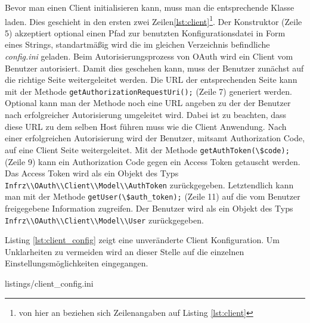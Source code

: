 \documentclass[12pt,a4paper,pointednumbers,abstracton]{scrartcl}
\newcommand{\code}[1]{\small\lstinline[style=InlinePHP]!#1!\normalsize}
\begin{document}
Bevor man einen Client initialisieren kann, muss man die entsprechende Klasse laden.
Dies geschieht in den ersten zwei Zeilen\ref{lst:client}\footnote{von hier an beziehen sich Zeilenangaben auf Listing \ref{lst:client}}.
Der Konstruktor (Zeile 5) akzeptiert optional einen Pfad zur benutzten Konfigurationsdatei in Form eines Strings, standartmäßig wird die im gleichen Verzeichnis befindliche \emph{config.ini} geladen.
Beim Autorisierungsprozess von OAuth wird ein Client vom Benutzer autorisiert.
Damit dies geschehen kann, muss der Benutzer zunächst auf die richtige Seite weitergeleitet werden.
Die URL der entsprechenden Seite kann mit der Methode \code{getAuthorizationRequestUri();} (Zeile 7) generiert werden.
Optional kann man der Methode noch eine URL angeben zu der der Benutzer nach erfolgreicher Autorisierung umgeleitet wird.
Dabei ist zu beachten, dass diese URL zu dem selben Host führen muss wie die Client Anwendung.
Nach einer erfolgreichen Autorisierung wird der Benutzer, mitsamt Authorization Code, auf eine Client Seite weitergeleitet.
Mit der Methode \code{getAuthToken(\$code);} (Zeile 9) kann ein Authorization Code gegen ein Access Token getauscht werden.
Das Access Token wird als ein Objekt des Typs \code{Infrz\\OAuth\\Client\\Model\\AuthToken} zurückgegeben.
Letztendlich kann man mit der Methode \code{getUser(\$auth_token);} (Zeile 11) auf die vom Benutzer freigegebene Information zugreifen.
Der Benutzer wird als ein Objekt des Typs \code{Infrz\\OAuth\\Client\\Model\\User} zurückgegeben.

Listing \ref{lst:client_config} zeigt eine unveränderte Client Konfiguration.
Um Unklarheiten zu vermeiden wird an dieser Stelle auf die einzelnen Einstellungsmöglichkeiten eingegangen.

\begin{minipage}{\textwidth}
	
	{listings/client_config.ini}
\end{minipage}
\end{document}

